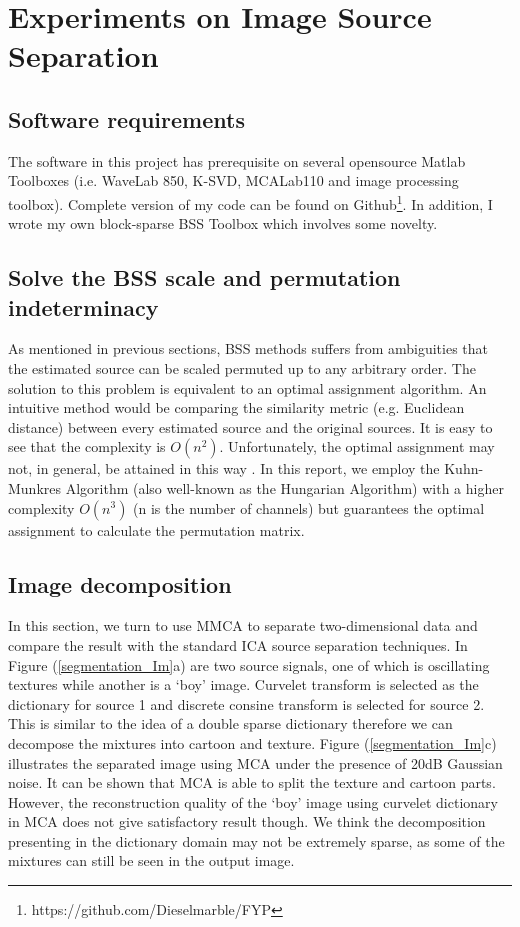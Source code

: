 \section{Experiments on Image Source Separation}
\subsection{Software requirements}
The software in this project has prerequisite on several opensource Matlab Toolboxes (i.e. WaveLab 850, K-SVD, MCALab110 and image processing toolbox). Complete version of my code can be found on Github\footnote{https://github.com/Dieselmarble/FYP}. In addition, I wrote my own block-sparse BSS Toolbox which involves some novelty.

\subsection{Solve the BSS scale and permutation indeterminacy}
As mentioned in previous sections, BSS methods suffers from ambiguities that the estimated source can be scaled permuted up to any arbitrary order. The solution to this problem is equivalent to an optimal assignment algorithm. An intuitive method would be comparing the similarity metric (e.g. Euclidean distance) between every estimated source and the original sources. It is easy to see that the complexity is $O(n^2)$. Unfortunately, the optimal assignment may not, in general, be attained in this way \cite{1261953}. In this report, we employ the Kuhn-Munkres Algorithm (also well-known as the Hungarian Algorithm)
with a higher complexity $O(n^3)$ (n is the number of channels) but guarantees the optimal assignment to calculate the permutation matrix.

\subsection{Image decomposition}
In this section, we turn to use MMCA to separate two-dimensional data and compare the result with the standard ICA source separation techniques. In Figure (\ref{segmentation_Im}a) are two source signals, one of which is oscillating textures while another is  a `boy' image. Curvelet transform is selected as the dictionary for source 1 and discrete consine transform is selected for source 2. This is similar to the idea of a double sparse dictionary therefore we can decompose the mixtures into cartoon and texture. Figure (\ref{segmentation_Im}c) illustrates the separated image using MCA under the presence of 20dB Gaussian noise. It can be shown that MCA is able to split the texture and cartoon parts. However, the reconstruction quality of the `boy' image using curvelet dictionary in MCA does not give satisfactory result though. We think the decomposition presenting in the dictionary domain may not be extremely sparse, as some of the mixtures can still be seen in the output image. \\

